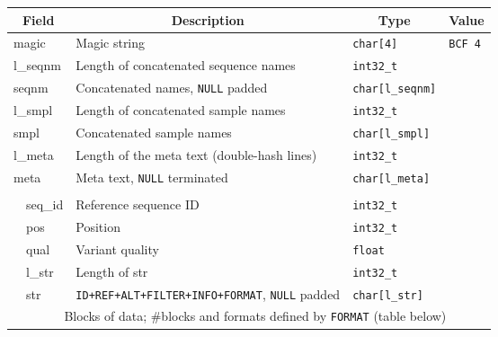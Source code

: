 \documentclass[10pt,pdftex]{article}
\begin{document}
\vspace{1\baselineskip}

\begin{center}
\begin{tabular}{|l|l|l|l|l|}
\hline
\multicolumn{2}{|c|}{\bf Field} & \multicolumn{1}{c|}{\bf Description} & \multicolumn{1}{c|}{\bf Type} & \multicolumn{1}{c|}{\bf Value} \\\hline\hline
\multicolumn{2}{|l|}{\sf magic} & Magic string & {\tt char[4]} & {\tt BCF\char92 4} \\\hline
\multicolumn{2}{|l|}{\sf l\_seqnm} & Length of concatenated sequence names & {\tt int32\_t} & \\\hline
\multicolumn{2}{|l|}{\sf seqnm} & Concatenated names, {\tt NULL} padded & {\tt char[{\sf l\_seqnm}]} & \\\hline
\multicolumn{2}{|l|}{\sf l\_smpl} & Length of concatenated sample names & {\tt int32\_t} & \\\hline
\multicolumn{2}{|l|}{\sf smpl} & Concatenated sample names & {\tt char[{\sf l\_smpl}]} & \\\hline
\multicolumn{2}{|l|}{\sf l\_meta} & Length of the meta text (double-hash lines)& {\tt int32\_t} & \\\hline
\multicolumn{2}{|l|}{\sf meta} & Meta text, {\tt NULL} terminated & {\tt char[{\sf l\_meta}]} & \\\hline
\multicolumn{5}{|c|}{\it \color{gray}{List of records until the end of the file}}\\\cline{2-5}
& {\sf seq\_id} & Reference sequence ID & {\tt int32\_t} & \\\cline{2-5}
& {\sf pos} & Position & {\tt int32\_t} & \\\cline{2-5}
& {\sf qual} & Variant quality & {\tt float} & \\\cline{2-5}
& {\sf l\_str} & Length of {\sf str} & {\tt int32\_t} & \\\cline{2-5}
& {\sf str} & {\tt ID+REF+ALT+FILTER+INFO+FORMAT}, {\tt NULL} padded & {\tt char[{\sf l\_str}]} &\\\cline{2-5}
& \multicolumn{4}{c|}{Blocks of data; \#blocks and formats defined by {\tt FORMAT} (table below)}\\
\hline
\end{tabular}
\end{center}
\end{document}
